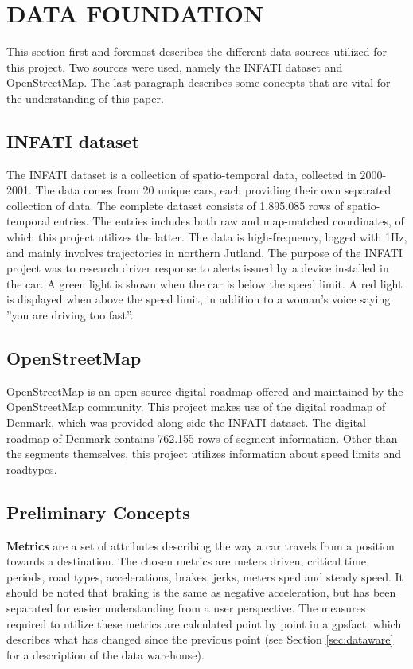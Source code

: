 \section{DATA FOUNDATION}\label{sec:datafound}

This section first and foremost describes the different data sources utilized for this project. Two sources were used, namely the INFATI dataset\cite{art:INFATI} and OpenStreetMap\cite{osm}. The last paragraph describes some concepts that are vital for the understanding of this paper. 

\subsection{INFATI dataset}
The INFATI dataset\cite{art:INFATI} is a collection of spatio-temporal data, collected in 2000-2001. The data comes from 20 unique cars, each providing their own separated collection of data. The complete dataset consists of 1.895.085 rows of spatio-temporal entries. The entries includes both raw and map-matched coordinates, of which this project utilizes the latter. The data is high-frequency, logged with 1Hz, and mainly involves trajectories in northern Jutland. The purpose of the INFATI\cite{art:INFATI} project was to research driver response to alerts issued by a device installed in the car. A green light is shown when the car is below the speed limit. A red light is displayed when above the speed limit, in addition to a woman's voice saying ''you are driving too fast''.

\subsection{OpenStreetMap}
OpenStreetMap\cite{osm} is an open source digital roadmap offered and maintained by the OpenStreetMap community. This project makes use of the digital roadmap of Denmark, which was provided along-side the INFATI dataset\cite{art:INFATI}. The digital roadmap of Denmark contains 762.155 rows of segment information. Other than the segments themselves, this project utilizes information about speed limits and roadtypes.

\subsection{Preliminary Concepts}\label{subsec:precon}
\textbf{Metrics} are a set of attributes describing the way a car travels from a position towards a destination. The chosen metrics are meters driven, critical time periods, road types, accelerations, brakes, jerks, meters sped and steady speed. It should be noted that braking is the same as negative acceleration, but has been separated for easier understanding from a user perspective. The measures required to utilize these metrics are calculated point by point in a gpsfact, which describes what has changed since the previous point (see Section \ref{sec:dataware} for a description of the data warehouse).

